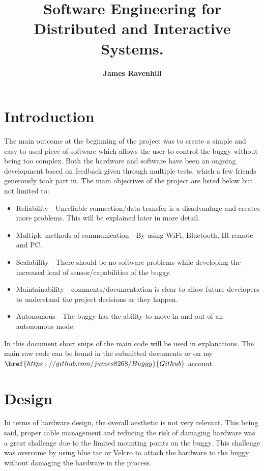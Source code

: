 \documentclass[8pt, a4paper]{article}
\begin{document}
\setlength \topmargin{-1in}
\title{\textbf{Software Engineering for Distributed and Interactive Systems.}}
\author{\textbf{James Ravenhill}}
\date{}
\maketitle

\section{Introduction} 

The main outcome at the beginning of the project was to create a simple and easy to used piece of software which allows the user to control the buggy without being too complex. Both the hardware and software have been an ongoing development based on feedback given through multiple tests, which a few friends generously took part in. The main objectives of the project are listed below but not limited to:

\begin{itemize}
	\item Reliability - Unreliable connection/data transfer is a disadvantage and creates more problems. This will be explained later in more detail.  
	\item  Multiple methods of communication - By using WiFi, Bluetooth, IR remote and PC. 
	\item Scalability - There should be no software problems while developing the increased load of sensor/capabilities of the buggy. 
	\item Maintainability - comments/documentation is clear to allow future developers to understand the project decisions as they happen. 
	\item Autonomous - The buggy has the ability to move in and out of an autonomous mode.  
\end{itemize}

In this document short snips of the main code will be used in explanations. The main raw code can be found in the submitted documents or on my $\href{https://github.com/james8268/Buggy}{Github}$ account.
 

\section{Design}
In terms of hardware design, the overall aesthetic is not very relevant. This being said, proper cable management and reducing the risk of damaging hardware was a great challenge due to the limited mounting points on the buggy. This challenge was overcome by using blue tac or Velcro to attach the hardware to the buggy without damaging the hardware in the process. 
\end{document}
